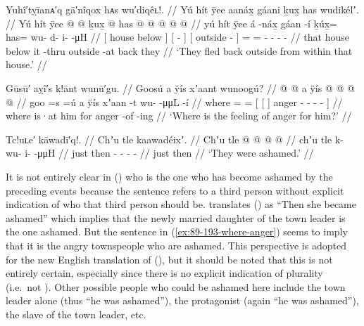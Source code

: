 \ex\label{ex:89-192-flee-back-outside}%
%
\begingl
	\glpreamble	Yuhî′tỵīanᴀ′q gā′nîqox hᴀs wu′diqêʟ!. //
	\glpreamble	Yú hít ÿee aanáx̱ gáani ḵux̱ has wudikélʼ. //
	\gla	{} Yú hít ÿee {}
		{}  @ {} {}
		{}  @ {} {}
		ḵux̱ @ has @  @ {} @ {} @ {} @ {} //
	\glb	{} yú hít ÿee {}
		{} á -náx̱ {}
		{} gáan -í {}
		ḵúx̱= has= wu- d- i-  -μH //
	\glc	{}[  house below {}]
		{}[  - {}]
		{}[ outside - {}]
		= = - - -  - //
	\gld	{} that house below {}
		{} it -thru {}
		{} outside -at {}
		back\• they\•  {} {} {} {} //
	\glft	‘They fled back outside from within that house.’
		//
\endgl
\xe

\ex\label{ex:89-193-where-anger}%
%
\begingl
	\glpreamble	Gūsū′ aỵî′s k!ānt wunū′gu. //
	\glpreamble	Goosú a ÿís xʼaant wunoogú? //
	\gla	{} @ {} @ {}
		{} {} a ÿís {}
			{}  @ {} {}
			 @ {} @ {} @ {} {} //
	\glb	goo =s =ú
		{} {} a ÿís {}
			{} xʼaan -t {}
			wu-  -μμL -í {} //
	\glc	where = =
		{}[ {}[   {}]
			{} anger - {}
			-  - - {}] //
	\gld	where \• \•is·at
		{} {} him for {}
			{} anger -of {}
			 {} {} -ing {} //
	\glft	‘Where is the feeling of anger for him?’
		//
\endgl
\xe

\clearpage
\ex\label{ex:89-194-ashamed}%
%
\begingl
	\glpreamble	Tc!uʟe′ kāwadī′q!. //
	\glpreamble	Chʼu tle kaawadéixʼ. //
	\gla	Chʼu tle  @ {} @ {} @ {} @ {} //
	\glb	chʼu tle k- wu- i-  -μμH //
	\glc	just then - - -  - //
	\gld	just then  {} {} {} {} //
	\glft	‘They were ashamed.’
		//
\endgl
\xe

It is not entirely clear in (\lastx) who is the one who has become ashamed by the preceding events because the sentence refers to a third person without explicit indication of who that third person should be.
\citeauthor{swanton:1909} translates (\lastx) as “Then she became ashamed” which implies that the newly married daughter of the town leader is the one ashamed.
But the sentence in (\ref{ex:89-193-where-anger}) seems to imply that it is the angry townspeople who are ashamed.
This perspective is adopted for the new English translation of (\lastx), but it should be noted that this is not entirely certain, especially since there is no explicit indication of plurality (i.e.\ not ).
Other possible people who could be ashamed here include the town leader alone (thus “he was ashamed”), the protagonist (again “he was ashamed”), the slave of the town leader, etc.

